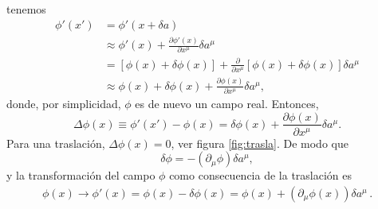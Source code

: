 tenemos
\begin{align}
  \phi'(x')&=\phi'(x+\delta a)\\
  &\approx\phi'(x)+\frac{\partial\phi'(x)}{\partial x^\mu}\delta a^\mu\\
  &=[\phi(x)+\delta\phi(x)]+\frac{\partial}{\partial x^\mu}[\phi(x)+\delta\phi(x)]\delta a^\mu\\
  &\approx\phi(x)+\delta\phi(x)+\frac{\partial\phi(x)}{\partial x^\mu}\delta a^\mu,
\end{align}
donde, por simplicidad, $\phi$ es de nuevo un campo real. Entonces,
\begin{equation}
  \label{eq:Deltaf}
  \Delta\phi(x)\equiv\phi'(x')-\phi(x)=\delta\phi(x)+\frac{\partial\phi(x)}{\partial x^\mu}\delta a^\mu.
\end{equation}
Para una traslaci\'on, $\Delta\phi(x)=0$, ver figura 
\ref{fig:trasla}. %
De modo que
\begin{equation}
  \label{eq:dmuxmu}
  \delta\phi=-(\partial_\mu\phi)\delta a^\mu,
\end{equation}
y la transformaci\'on del campo $\phi$ como consecuencia de la traslaci\'on es
\begin{align}
  \phi(x)\to\phi'(x)=\phi(x)-\delta\phi(x)=\phi(x)+(\partial_\mu\phi(x))\delta a^\mu\,.
\end{align}

